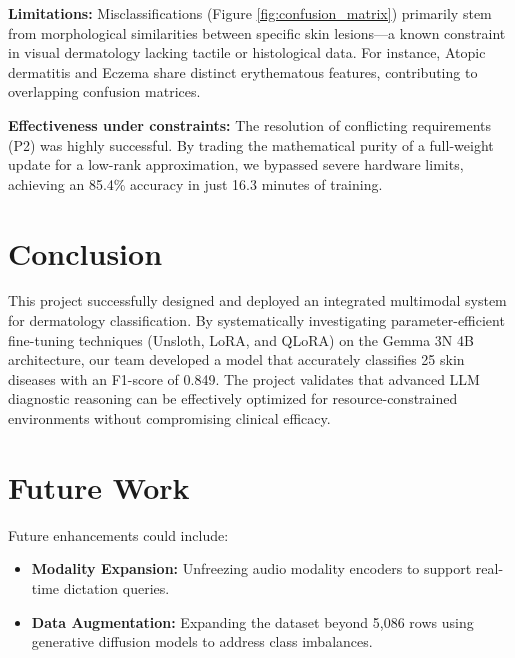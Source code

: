 \documentclass[12pt, a4paper]{article}
\begin{document}
\textbf{Limitations:} Misclassifications (Figure \ref{fig:confusion_matrix}) primarily stem from morphological similarities between specific skin lesions—a known constraint in visual dermatology lacking tactile or histological data. For instance, Atopic dermatitis and Eczema share distinct erythematous features, contributing to overlapping confusion matrices.

\textbf{Effectiveness under constraints:} The resolution of conflicting requirements (P2) was highly successful. By trading the mathematical purity of a full-weight update for a low-rank approximation, we bypassed severe hardware limits, achieving an 85.4\% accuracy in just 16.3 minutes of training.

\section{Conclusion}
This project successfully designed and deployed an integrated multimodal system for dermatology classification. By systematically investigating parameter-efficient fine-tuning techniques (Unsloth, LoRA, and QLoRA) on the Gemma 3N 4B architecture, our team developed a model that accurately classifies 25 skin diseases with an F1-score of 0.849. The project validates that advanced LLM diagnostic reasoning can be effectively optimized for resource-constrained environments without compromising clinical efficacy.

\section{Future Work}
Future enhancements could include:
\begin{itemize}
  \item \textbf{Modality Expansion:} Unfreezing audio modality encoders to support real-time dictation queries.
  \item \textbf{Data Augmentation:} Expanding the dataset beyond 5,086 rows using generative diffusion models to address class imbalances.
\end{itemize}



\end{document}
